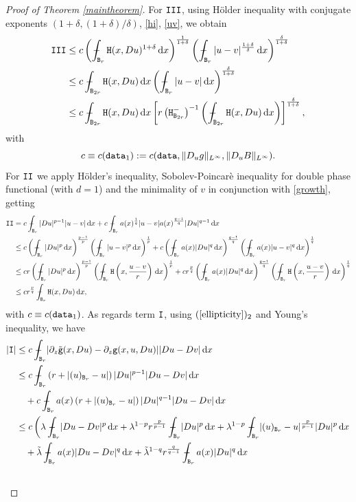 \documentclass[a4paper]{amsart}
\theoremstyle{plain}  %
\numberwithin{equation}{section}
\def\dx{\,{\rm d}x}
\newcommand{\mint}{\mathop{\int\hskip -1,05em -\, \!\!\!}\nolimits}
\newcommand{\br}{\tx{B}_{r}}
\newcommand{\brr}{\tx{B}_{2r}}
\newcommand{\ff}{\tx{H}}
\newcommand{\g}{\tx{g}}
\newcommand{\snr}[1]{\lvert #1\rvert}
\newcommand{\nr}[1]{\lVert #1 \rVert}
\newcommand{\tx}[1]{\textnormal{\texttt{#1}}}
\begin{document}
\begin{proof}[Proof of Theorem \ref{maintheorem}]
\noindent
For $\tx{III}$, using H\"older inequality with conjugate exponents $(1+\delta, (1+\delta)/\delta)$, \eqref{hi}, \eqref{uv}, we obtain
\begin{align} \label{e1}
   \tx{III} & \leq  c\left ( \mint_{\br} \ff(x,Du)^{1+\delta} \dx \right )^{\frac{1}{1+\delta}} \left (  \mint_{\br} |u-v|^{\frac{1+\delta}{\delta}} \dx\right )^{\frac{\delta}{1+\delta}} \notag\\ & \leq c \mint_{\brr} \ff(x,Du) \dx \left (  \mint_{\br} |u-v| \dx\right )^{\frac{\delta}{1+\delta}} \notag\\ & \leq c\mint_{\brr}\ff(x,Du) \dx  \left [ r\left (\tx{H}^-_{\brr}\right )^{-1}\left ( \mint_{\brr} \ff(x,Du) \dx\right )\right ]^{\frac{\delta}{1+\delta}},
\end{align}
with $$c \equiv c(\tx{data}_1) :=c(\tx{data}, \nr{D_ug}_{L^{\infty}},\nr{D_uB}_{L^{\infty}} ).$$ For $\tx{II}$ we apply H\"older's inequality, Sobolev-Poincarè inequality for double phase functional (with $d=1$) and the minimality of $v$ in conjunction with \eqref{growth}, getting
\begin{align} \label{e2}
\tx{II} & = c\mint_{\br}|Du|^{p-1}|u-v| \dx + c\mint_{\br} a(x)^{\frac{1}{q}}|u-v|a(x)^{\frac{q-1}{q}}|Du|^{q-1} \dx \notag \\ & \leq c\left( \mint_{\br} 
|Du|^p \dx\right)^{\frac{p-1}{p}} \left (\mint_{\br} |u-v|^{p} \dx \right )^{\frac{1}{p}} + c\left( \mint_{\br} 
a(x)|Du|^q \dx\right)^{\frac{q-1}{q}} \left (\mint_{\br} a(x)|u-v|^{q} \dx \right )^{\frac{1}{q}} \notag \\ & \leq cr\left( \mint_{\br} 
|Du|^p \dx\right)^{\frac{p-1}{p}} \left (\mint_{\br} \tx{H}\left (x,\frac{u-v}{r}\right ) \dx \right )^{\frac{1}{p}} + cr^{\frac{p}{q}}\left( \mint_{\br} 
a(x)|Du|^q \dx\right)^{\frac{q-1}{q}} \left (\mint_{\br} \tx{H}\left (x,\frac{u-v}{r}\right )\dx \right )^{\frac{1}{q}} \notag
\\ &  \leq cr^{\frac{p}{q}} \mint_{\br}\ff(x,Du) \dx,
\end{align}
\noindent
with $c \equiv c(\tx{data}_1)$. As regards term $\tx{I}$, using $(\ref{ellipticity})_2$
 and Young's inequality, we have
\begin{align*}
    \snr{\tx{I}} & \leq c\mint_{\br}\snr{\partial_z \tilde{\g}(x,Du) - \partial_z \g(x,u,Du)}\snr{Du-Dv} \dx \\ & \leq c  \mint_{\br}\left (r + \snr{(u)_{\br}-u} \right )\snr{Du}^{p-1}\snr{Du-Dv} \dx \\ & \quad + c  \mint_{\br} a(x)\left (r + \snr{(u)_{\br}-u} \right )\snr{Du}^{q-1}\snr{Du-Dv} \dx  \\ & \leq c \left (\lambda \mint_{\br} \snr{Du-Dv}^p \dx + \lambda^{1-p} r^{\frac{p}{p-1}}\mint_{\br}\snr{Du}^{p} \dx + \lambda^{1-p}\mint_{\br}\snr{(u)_{\br} -u}^{\frac{p}{p-1}} \snr{Du}^p \dx \right . \\ & \quad +  \tilde{\lambda} \mint_{\br} a(x)\snr{Du-Dv}^q \dx + \tilde{\lambda}^{1-q}r^{\frac{q}{q-1}} \mint_{\br}a(x)\snr{Du}^{q} \dx \\ & 

\end{align*}
\end{proof}
\end{document}
